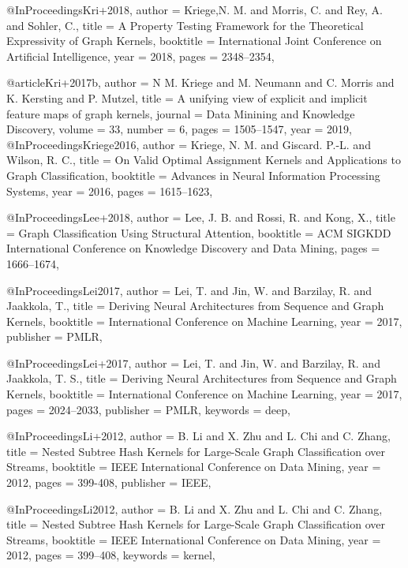@InProceedings{Kri+2018,
  author    = {Kriege,N. M. and Morris, C. and Rey, A. and Sohler, C.},
  title     = {A Property Testing Framework for the Theoretical Expressivity of Graph Kernels},
  booktitle = {International Joint Conference on Artificial Intelligence},
  year      = {2018},
  pages     = {2348--2354},
}

@article{Kri+2017b,
	author    = {N M. Kriege and
	M. Neumann and
	C. Morris and
	K. Kersting and
	P. Mutzel},
	title     = {A unifying view of explicit and implicit feature maps of graph kernels},
	journal   = {Data Minining and Knowledge Discovery},
	volume    = {33},
	number    = {6},
	pages     = {1505--1547},
	year      = {2019},
}
@InProceedings{Kriege2016,
  author    = {Kriege, N. M. and Giscard. P.-L. and Wilson, R. C.},
  title     = {On Valid Optimal Assignment Kernels and Applications to Graph Classification},
  booktitle = {Advances in Neural Information Processing Systems},
  year      = {2016},
  pages     = {1615--1623},
}

@InProceedings{Lee+2018,
  author    = {Lee, J. B. and Rossi, R. and Kong, X.},
  title     = {Graph Classification Using Structural Attention},
  booktitle = {ACM SIGKDD International Conference on Knowledge Discovery and Data Mining},
  pages     = {1666--1674},
}

@InProceedings{Lei2017,
  author    = {Lei, T. and Jin, W. and Barzilay, R. and Jaakkola, T.},
  title     = {Deriving Neural Architectures from Sequence and Graph Kernels},
  booktitle = {International Conference on Machine Learning},
  year      = {2017},
  publisher = {PMLR},
}

@InProceedings{Lei+2017,
  author    = {Lei, T. and Jin, W. and Barzilay, R. and Jaakkola, T. S.},
  title     = {Deriving Neural Architectures from Sequence and Graph Kernels},
  booktitle = {International Conference on Machine Learning},
  year      = {2017},
  pages     = {2024--2033},
  publisher = {PMLR},
  keywords  = {deep},
}

@InProceedings{Li+2012,
  author    = {B. Li and X. Zhu and L. Chi and C. Zhang},
  title     = {Nested Subtree Hash Kernels for Large-Scale Graph Classification over Streams},
  booktitle = {{IEEE} International Conference on Data Mining},
  year      = {2012},
  pages     = {399-408},
  publisher = {IEEE},
}

@InProceedings{Li2012,
  author    = {B. Li and X. Zhu and L. Chi and C. Zhang},
  title     = {Nested Subtree Hash Kernels for Large-Scale Graph Classification over Streams},
  booktitle = {IEEE International Conference on Data Mining},
  year      = {2012},
  pages     = {399--408},
  keywords  = {kernel},
}


